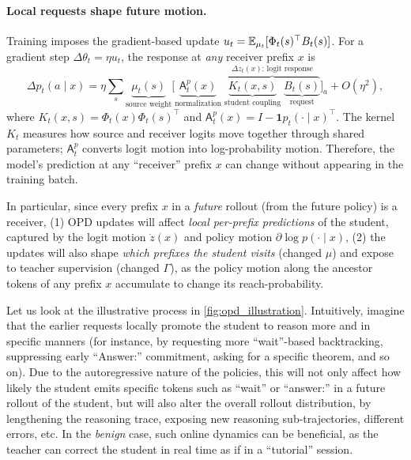\paragraph{Local requests shape future motion.}
Training imposes the gradient-based update \mbox{$u_t=\mathbb{E}_{\mu_t}[\Phi_t(s)^\top B_t(s)]$}.
For a gradient step $\Delta\theta_t=\eta u_t$, the response at \emph{any} receiver prefix $x$ is
\begin{equation}
\Delta p_t(a \mid x)
=
\eta\sum_s
\underbrace{\mu_t(s)}_{\text{source weight}}
\Big[
\underbrace{\mathsf A_t^p(x)}_{\text{normalization}}\;
\overbrace{\underbrace{K_t(x,s)}_{\text{student coupling}}\;
\underbrace{B_t(s)}_{\text{request}}}^{\Delta z_t(x)\text{: logit response}}
\Big]_a+O(\eta^2),
\label{eq:response-law}
\end{equation}
where $K_t(x,s)=\Phi_t(x)\Phi_t(s)^\top$ and $\mathsf A_t^p(x)=I-\mathbf1p_t(\cdot\mid x)^\top$.
The kernel $K_t$ measures how source and receiver logits move together through shared parameters; $\mathsf A_t^p$ converts logit motion into log-probability motion. Therefore, the model's prediction at any ``receiver'' prefix $x$ can change without appearing in the training batch.

In particular, since every prefix $x$ in a \emph{future} rollout (from the future policy) is a receiver, (1) OPD updates will affect \emph{local per-prefix predictions} of the student, captured by the logit motion $\dot{z}(x)$ and policy motion $\partial \log p(\cdot \mid x)$, (2) the updates will also shape \emph{which prefixes the student visits} (changed $\mu$) and expose to teacher supervision (changed $\Gamma$), as the policy motion along the ancestor tokens of any prefix $x$ accumulate to change its reach-probability. 

Let us look at the illustrative process in \cref{fig:opd_illustration}. Intuitively, imagine that the earlier requests locally promote the student to reason more and in specific manners (for instance, by requesting more ``wait''-based backtracking, suppressing early ``Answer:'' commitment, asking for a specific theorem, and so on). Due to the autoregressive nature of the policies, this will not only affect how likely the student emits specific tokens such as ``wait'' or ``answer:'' in a future rollout of the student, but will also alter the overall rollout distribution, by lengthening the reasoning trace, exposing new reasoning sub-trajectories, different errors, etc. In the \emph{benign} case, such online dynamics can be beneficial, as the teacher can correct the student in real time as if in a ``tutorial'' session. 

